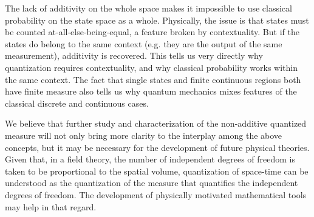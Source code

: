 \documentclass[entropy,article,submit,pdftex,moreauthors]{Definitions/mdpi}
\begin{document}
The lack of additivity on the whole space makes it impossible to use classical probability on the state space as a whole. Physically, the issue is that states must be counted at-all-else-being-equal, a feature broken by contextuality. But if the states do belong to the same context (e.g. they are the output of the same measurement), additivity is recovered. This tells us very directly why quantization requires contextuality, and why classical probability works within the same context. The fact that single states and finite continuous regions both have finite measure also tells us why quantum mechanics mixes features of the classical discrete and continuous cases.

We believe that further study and characterization of the non-additive quantized measure will not only bring more clarity to the interplay among the above concepts, but it may be necessary for the development of future physical theories. Given that, in a field theory, the number of independent degrees of freedom is taken to be proportional to the spatial volume, quantization of space-time can be understood as the quantization of the measure that quantifies the independent degrees of freedom. The development of physically motivated mathematical tools may help in that regard.



\vspace{6pt} 



\end{document}
